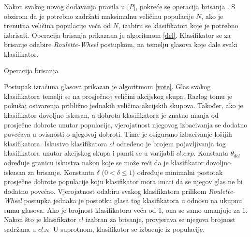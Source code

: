 \documentclass[times, utf8, zavrsni]{fer}
\begin{document}
Nakon svakog novog dodavanja pravila u [\emph{P}], pokreće se operacija brisanja \citep{1}.
S obzirom da je potrebno zadržati maksimalnu veličinu populacije $N$, ako je trenutna veličina populacije veća od $N$, izabiru se klasifikatori koje je potrebno izbrisati.
Operacija brisanja prikazana je algoritmom \ref{del}.
Klasifikator se za brisanje odabire \emph{Roulette-Wheel} postupkom, na temelju glasova koje dale svaki klasifikator.
\begin{algorithm}
    \caption{Operacija brisanja}
    \label{del}
    \begin{algorithmic}
        \RETURN
        \ENDIF
        \ENDFOR
        \STATE{$r$ := proizvoljan decimalni broj iz intervala [0, 1)}
        \ELSE
        \ENDIF
        \RETURN
        \ENDIF
        \ENDFOR
    \end{algorithmic}
\end{algorithm}
Postupak izračuna glasova prikazan je algoritmom \ref{vote}.
Glas svakog klasifikatora temelji se na prosječnoj veličini akcijskog skupa.
Razlog tomu je pokušaj ostvarenja približno jednakih veličina akcijskih skupova.
Također, ako je klasifikator dovoljno iskusan, a dobrota klasifikatora je znatno manja od prosječne dobrote unutar populacije, vjerojatnost njegovog izbacivanja se dodatno povećava u ovisnosti o njegovoj dobroti.
Time je osigurano izbacivanje lošijih klasifikatora.
Iskustvo klasifikatora $cl$ određeno je brojem pojavljivanja tog klasifikatora unutar akcijskog skupa i pamti se u varijabli $cl.exp$.
Konstanta $\theta_{del}$ određuje granicu iskustva nakon koje se može reći da je klasifikator dovoljno iskusan za brisanje.
Konstanta $\delta$ ($0 < \delta \leq 1$) određuje minimalni postotak prosječne dobrote populacije koju klasifikator mora imati da se njegov glas ne bi dodatno povećao.
Vjerojatnost odabira svakog klasifikatora prilikom \emph{Roulette-Wheel} postupka jednaka je postotku glasa tog klasifikatora u odnosu na ukupnu sumu glasova.
Ako je brojnost klasifikatora veća od 1, ona se samo umanjuje za 1.
Nakon što je klasifikator $cl$ izabran za brisanje, provjerava se njegova brojnost sadržana u $cl.n$.
U suprotnom, klasifikator se izbacuje iz populacije.
\end{document}

